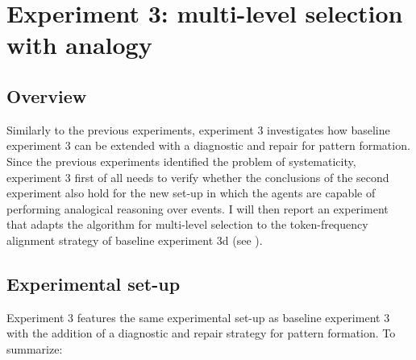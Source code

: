 \section{Experiment 3: multi-level selection with analogy}
\label{s:pattern-exp-3}

\subsection{Overview}
Similarly to the previous experiments, experiment 3 investigates how baseline experiment 3 can be extended with a diagnostic and repair for pattern formation. Since the previous experiments identified the problem of systematicity, experiment 3 first of all needs to verify whether the conclusions of the second experiment also hold for the new set-up in which the agents are capable of performing analogical reasoning over events. I will then report an experiment that adapts the algorithm for multi-level selection to the token-frequency alignment strategy of baseline experiment 3d (see ).

\subsection{Experimental set-up}

Experiment 3 features the same experimental set-up as baseline experiment 3 with the addition of a diagnostic and repair strategy for pattern formation. To summarize:

